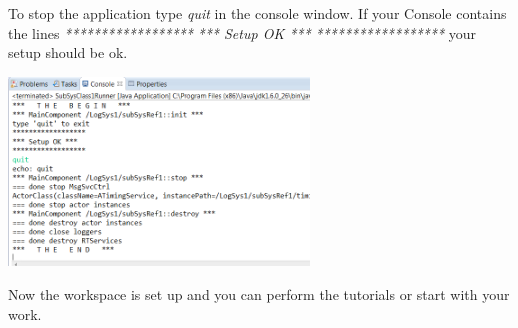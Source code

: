 To stop the application type \emph{quit} in the console window. If your Console contains the lines
\newline\emph{******************}
\newline\emph{*** Setup OK ***}
\newline\emph{******************} 
\newline your setup should be ok.
 
\includegraphics[width=0.6\textwidth]{images/013-SetupWorkspace07.png} 

Now the workspace is set up and you can perform the tutorials or start with your work.
